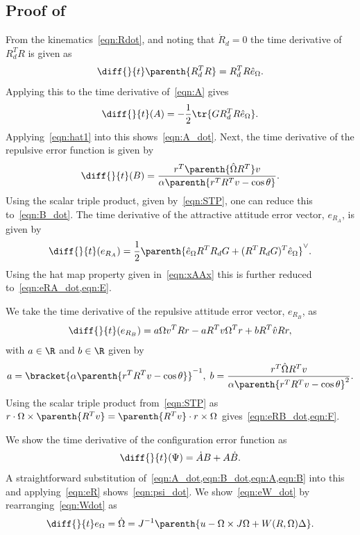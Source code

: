 \subsection{Proof of~}\label{proof:error_dyn}
From the kinematics~\cref{eqn:Rdot}, and noting that \( \dot{R}_d = 0 \) the time derivative of \( R_d^T R \) is given as
\begin{gather*}
	\diff{}{t} \parenth{R_d^T R} = R_d^T R \hat{e}_\Omega .
\end{gather*}
Applying this to the time derivative of~\cref{eqn:A} gives
\begin{gather*}
	\diff{}{t} (A) = -\frac{1}{2} \tr{G R_d^T R \hat{e}_\Omega} .
\end{gather*}
Applying~\cref{eqn:hat1} into this shows~\cref{eqn:A_dot}.
Next, the time derivative of the repulsive error function is given by
\begin{gather*}
	\diff{}{t} (B) = \frac{r^T \parenth{\hat{\Omega} R^T} v}{\alpha \parenth{r^T R^T v - \cos \theta}} .
\end{gather*}
Using the scalar triple product, given by~\cref{eqn:STP}, one can reduce this to~\cref{eqn:B_dot}.
The time derivative of the attractive attitude error vector, \( e_{R_A} \), is given by
\begin{gather*}
	\diff{}{t} ( e_{R_A}) = \frac{1}{2} \parenth{\hat{e}_\Omega R^T R_d G + (R^T R_d G)^T \hat{e}_\Omega}^\vee .
\end{gather*}
Using the hat map property given in~\cref{eqn:xAAx} this is further reduced to~\cref{eqn:eRA_dot,eqn:E}.

We take the time derivative of the repulsive attitude error vector, \( e_{R_B} \), as
\begin{gather*}
	\diff{}{t}( e_{R_B} )= a \Omega v^T R r - a R^T v \Omega^T r + b R^T \hat{v} R r ,
\end{gather*}
with \( a \in \R \) and \( b \in \R\) given by 
\begin{gather*}
	a = \bracket{\alpha \parenth{r^T R^T v - \cos \theta}}^{-1} , \;
	b = \frac{r^T \hat{\Omega} R^T v}{\alpha \parenth{r^T R^T v - \cos \theta}^2} .
\end{gather*}
Using the scalar triple product from~\cref{eqn:STP} as \( r \cdot \Omega \times \parenth{R^T v} = \parenth{R^T v} \cdot r \times \Omega \) gives~\cref{eqn:eRB_dot,eqn:F}.

We show the time derivative of the configuration error function as
\begin{gather*}
	\diff{}{t} (\Psi) = \dot{A} B + A \dot{B} .
\end{gather*}
A straightforward substitution of~\cref{eqn:A_dot,eqn:B_dot,eqn:A,eqn:B} into this and applying~\cref{eqn:eR} shows~\cref{eqn:psi_dot}.
We show~\cref{eqn:eW_dot} by rearranging~\cref{eqn:Wdot} as 
\begin{align*}
	\diff{}{t} e_\Omega = \dot{\Omega} = J^{-1} \parenth{u - \Omega \times J \Omega + W(R,\Omega) \Delta } .
\end{align*}

